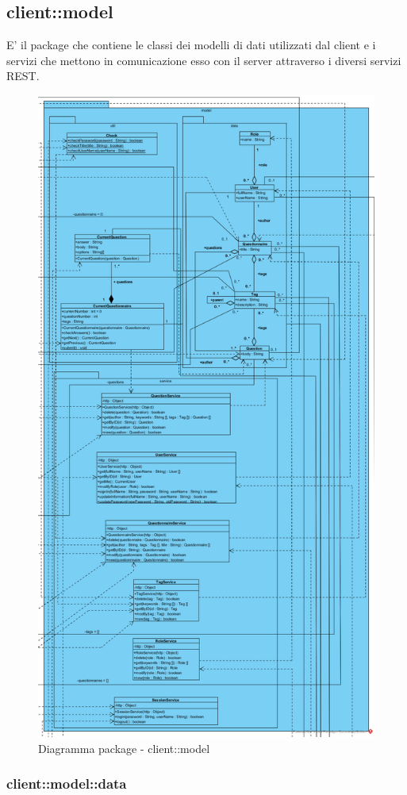 \subsection{client::model}
E' il package che contiene le classi dei modelli di dati utilizzati
dal client e i servizi che mettono in comunicazione esso con il server
attraverso i diversi servizi REST.\begin{center}
	\begin{figure}[H]
		\centering \includegraphics[scale=4, max width=\textwidth, max height=\myheight]{../img/diagrammiClassi/client/model.png}
		\caption{Diagramma package - client::model}
	\end{figure}
\end{center}\subsubsection{client::model::data}
